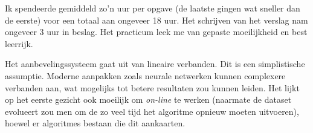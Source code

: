 
Ik spendeerde gemiddeld zo'n uur per opgave (de laatste gingen wat sneller dan de eerste) voor een totaal aan ongeveer 18 uur. Het schrijven van het verslag nam ongeveer 3 uur in beslag. Het practicum leek me van gepaste moeilijkheid en best leerrijk.\\

\par\noindent Het aanbevelingssysteem gaat uit van lineaire verbanden. Dit is een simplistische assumptie. Moderne aanpakken zoals neurale netwerken kunnen complexere verbanden aan, wat mogelijks tot betere resultaten zou kunnen leiden. Het lijkt op het eerste gezicht ook moeilijk om \textit{on-line} te werken (naarmate de dataset evolueert zou men om de zo veel tijd het algoritme opnieuw moeten uitvoeren), hoewel er algoritmes bestaan die dit aankaarten.